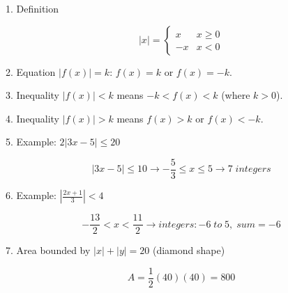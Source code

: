1. Definition

$$ |x| = \left\{ \begin{array}{ll} x & x \ge 0 \\ -x & x < 0 \end{array} \right. $$

2. Equation $|f(x)| = k$: $f(x) = k$ or $f(x) = -k$.

3. Inequality $|f(x)| < k$ means $-k < f(x) < k$ (where $k > 0$).

4. Inequality $|f(x)| > k$ means $f(x) > k$ or $f(x) < -k$.

5. Example: $2|3x - 5| \le 20$

$$ |3x-5| \le 10 \rightarrow -\frac{5}{3} \le x \le 5 \rightarrow 7 \; integers $$

6. Example: $\left|\frac{2x+1}{3}\right| < 4$

$$ -\frac{13}{2} < x < \frac{11}{2} \rightarrow integers: -6 \; to \; 5, \; sum = -6 $$

7. Area bounded by $|x| + |y| = 20$ (diamond shape)

$$ A = \frac{1}{2}(40)(40) = 800 $$
